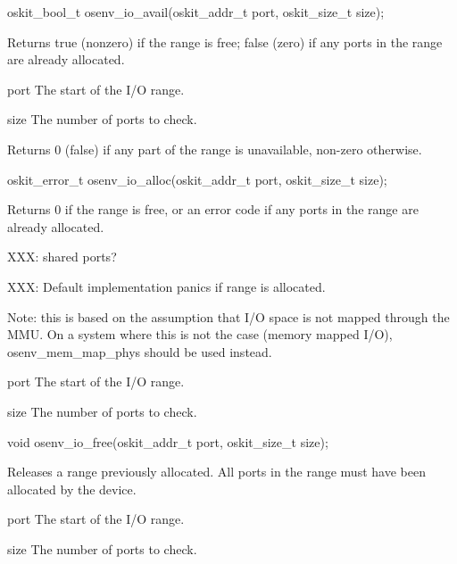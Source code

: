 \begin{apisyn}
	\funcproto oskit_bool_t osenv_io_avail(oskit_addr_t port, oskit_size_t size);
\end{apisyn}
\drvtoosn
\begin{apidesc}
	Returns true (nonzero) if the range is free;
	false (zero) if any ports in the range are already allocated.
\end{apidesc}
\begin{apiparm}
	\item[port]
		The start of the I/O range.
	\item[size]
		The number of ports to check.
\end{apiparm}
\begin{apiret}
	Returns 0 (false) if any part of the range is unavailable, non-zero
	otherwise.
\end{apiret}


\begin{apisyn}
	\funcproto oskit_error_t osenv_io_alloc(oskit_addr_t port, oskit_size_t size);
\end{apisyn}
\drvtoosn
\begin{apidesc}
	Returns 0 if the range is free,
	or an error code if any ports in the range are already allocated.

	XXX: shared ports?

	XXX: Default implementation panics if range is allocated.

	Note: this is based on the assumption that I/O space is not
	mapped through the MMU\@.  On a system where this is not the
	case (memory mapped I/O), osenv_mem_map_phys should be used
	instead.
\end{apidesc}
\begin{apiparm}
	\item[port]
		The start of the I/O range.
	\item[size]
		The number of ports to check.
\end{apiparm}



\begin{apisyn}
	\funcproto void osenv_io_free(oskit_addr_t port, oskit_size_t size);
\end{apisyn}
\drvtoosn
\begin{apidesc}
	Releases a range previously allocated.
	All ports in the range must have been allocated by the device.
\end{apidesc}
\begin{apiparm}
	\item[port]
		The start of the I/O range.
	\item[size]
		The number of ports to check.
\end{apiparm}



